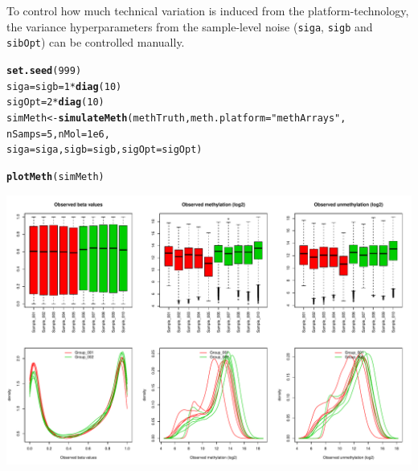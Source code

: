 \documentclass{article}\usepackage[]{graphicx}\usepackage[usenames,dvipsnames]{color}
\makeatletter
\def\maxwidth{ %
  \ifdim\Gin@nat@width>\linewidth
    \linewidth
  \else
    \Gin@nat@width
  \fi
}
\newcommand{\hlnum}[1]{\textcolor[rgb]{0.686,0.059,0.569}{#1}}%
\newcommand{\hlstr}[1]{\textcolor[rgb]{0.192,0.494,0.8}{#1}}%
\newcommand{\hlopt}[1]{\textcolor[rgb]{0,0,0}{#1}}%
\newcommand{\hlstd}[1]{\textcolor[rgb]{0.345,0.345,0.345}{#1}}%
\newcommand{\hlkwb}[1]{\textcolor[rgb]{0.69,0.353,0.396}{#1}}%
\newcommand{\hlkwc}[1]{\textcolor[rgb]{0.333,0.667,0.333}{#1}}%
\newcommand{\hlkwd}[1]{\textcolor[rgb]{0.737,0.353,0.396}{\textbf{#1}}}%
\newenvironment{kframe}{%
 \def\at@end@of@kframe{}%
 \ifinner\ifhmode%
  \def\at@end@of@kframe{\end{minipage}}%
  \begin{minipage}{\columnwidth}%
 \fi\fi%
 \def\FrameCommand##1{\hskip\@totalleftmargin \hskip-\fboxsep
 \colorbox{shadecolor}{##1}\hskip-\fboxsep
     \hskip-\linewidth \hskip-\@totalleftmargin \hskip\columnwidth}%
 \MakeFramed {\advance\hsize-\width
   \@totalleftmargin\z@ \linewidth\hsize
   \@setminipage}}%
 {\par\unskip\endMakeFramed%
 \at@end@of@kframe}
\newenvironment{knitrout}{}{} %
\makeatother
\begin{document}
To control how much technical variation is induced from the 
platform-technology, the variance hyperparameters from the sample-level 
noise (\texttt{siga}, \texttt{sigb} and \texttt{sibOpt}) can be 
controlled manually.
\begin{knitrout}
\color{fgcolor}\begin{kframe}
\begin{alltt}
\hlkwd{set.seed}\hlstd{(}\hlnum{999}\hlstd{)}
\hlstd{siga} \hlkwb{=} \hlstd{sigb} \hlkwb{=} \hlnum{1} \hlopt{*} \hlkwd{diag}\hlstd{(}\hlnum{10}\hlstd{)}
\hlstd{sigOpt} \hlkwb{=} \hlnum{2} \hlopt{*} \hlkwd{diag}\hlstd{(}\hlnum{10}\hlstd{)}
\hlstd{simMeth} \hlkwb{<-} \hlkwd{simulateMeth}\hlstd{(methTruth,}  \hlkwc{meth.platform} \hlstd{=} \hlstr{"methArrays"}\hlstd{,}
                        \hlkwc{nSamps} \hlstd{=} \hlnum{5}\hlstd{,} \hlkwc{nMol} \hlstd{=} \hlnum{1e6}\hlstd{,}
                        \hlkwc{siga} \hlstd{= siga,} \hlkwc{sigb} \hlstd{= sigb,} \hlkwc{sigOpt} \hlstd{= sigOpt)}
\end{alltt}


{\ttfamily\noindent\itshape\color{messagecolor}{\#\# Simulating DNA methylation samples using the meth.platform: methArrays}}\begin{alltt}
\hlkwd{plotMeth}\hlstd{(simMeth)}
\end{alltt}
\end{kframe}
\includegraphics[width=\maxwidth]{figure/simMeth-figs3-1} 

\end{knitrout}
\end{document}
